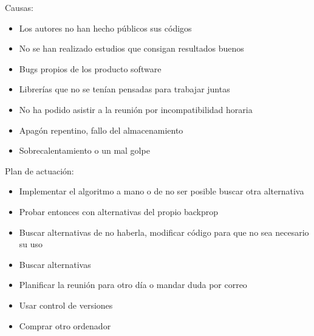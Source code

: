 Causas:
\begin{itemize}
    \item Los autores no han hecho públicos sus códigos
    \item No se han realizado estudios que consigan resultados buenos
    \item Bugs propios de los producto software
    \item Librerías que no se tenían pensadas para trabajar juntas
    \item No ha podido asistir a la reunión por incompatibilidad horaria
    \item Apagón repentino, fallo del almacenamiento
    \item Sobrecalentamiento o un mal golpe
\end{itemize}

Plan de actuación:
\begin{itemize}
    \item Implementar el algoritmo a mano o de no ser posible buscar otra alternativa
    \item Probar entonces con alternativas del propio backprop
    \item Buscar alternativas de no haberla, modificar código para que no sea necesario su uso
    \item Buscar alternativas
    \item Planificar la reunión para otro día o mandar duda por correo
    \item Usar control de versiones
    \item Comprar otro ordenador
\end{itemize}



